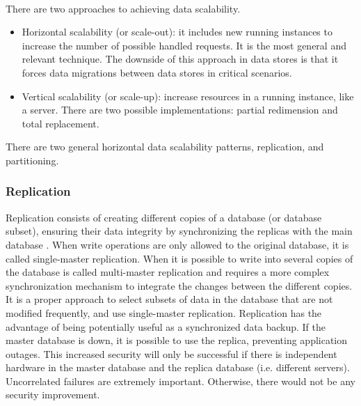 \documentclass[12pt,english]{article} %
\begin{document}
\

There are two approaches to achieving data scalability.

\begin{itemize}
    \item Horizontal scalability (or scale-out): it includes new running instances to increase the number of possible handled requests.
    It is the most general and relevant technique.
    The downside of this approach in data stores is that it forces data migrations between data stores in critical scenarios.
    \item Vertical scalability (or scale-up): increase resources in a running instance, like a server.
    There are two possible implementations: partial redimension and total replacement.
\end{itemize}


There are two general horizontal data scalability patterns, replication, and partitioning.


\subsubsection{Replication}

Replication consists of creating different copies of a database (or database subset), ensuring their data integrity by synchronizing the replicas with the main database \cite{multi-tenant-data-architecture}.
When write operations are only allowed to the original database, it is called single-master replication.
When it is possible to write into several copies of the database is called multi-master replication and requires a more complex synchronization mechanism to integrate the changes between the different copies.
It is a proper approach to select subsets of data in the database that are not modified frequently, and use single-master replication.
Replication has the advantage of being potentially useful as a synchronized data backup.
If the master database is down, it is possible to use the replica, preventing application outages.
This increased security will only be successful if there is independent hardware in the master database and the replica database (i.e. different servers).
Uncorrelated failures are extremely important.
Otherwise, there would not be any security improvement.


\
\end{document}
